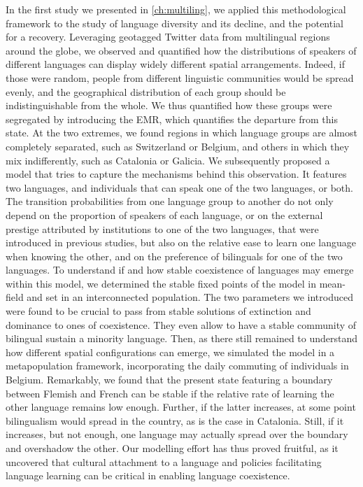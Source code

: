 \documentclass[../thesis.tex]{subfiles}
\begin{document}
In the first study we presented in \cref{ch:multiling}, we applied this methodological
framework to the study of language diversity and its decline, and the potential for a
recovery. Leveraging geotagged Twitter data from multilingual regions around the globe,
we observed and quantified how the distributions of speakers of different languages can
display widely different spatial arrangements. Indeed, if those were random, people from
different linguistic communities would be spread evenly, and the geographical
distribution of each group should be indistinguishable from the whole. We thus
quantified how these groups were segregated by introducing the \ac{EMR}, which
quantifies the departure from this state. At the two extremes, we found regions in which
language groups are almost completely separated, such as Switzerland or Belgium, and
others in which they mix indifferently, such as Catalonia or Galicia. We subsequently
proposed a model that tries to capture the mechanisms behind this observation. It
features two languages, and individuals that can speak one of the two languages, or
both. The transition probabilities from one language group to another do not only depend
on the proportion of speakers of each language, or on the external prestige attributed
by institutions to one of the two languages, that were introduced in previous studies,
but also on the relative ease to learn one language when knowing the other, and on the
preference of bilinguals for one of the two languages. To understand if and how stable
coexistence of languages may emerge within this model, we determined the stable fixed
points of the model in mean-field and set in an interconnected population. The two
parameters we introduced were found to be crucial to pass from stable solutions of
extinction and dominance to ones of coexistence. They even allow to have a stable
community of bilingual sustain a minority language. Then, as there still remained to
understand how different spatial configurations can emerge, we simulated the model in a
metapopulation framework, incorporating the daily commuting of individuals in Belgium.
Remarkably, we found that the present state featuring a boundary between Flemish and
French can be stable if the relative rate of learning the other language remains low
enough. Further, if the latter increases, at some point bilingualism would spread in the
country, as is the case in Catalonia. Still, if it increases, but not enough, one
language may actually spread over the boundary and overshadow the other. Our modelling
effort has thus proved fruitful, as it uncovered that cultural attachment to a language
and policies facilitating language learning can be critical in enabling language
coexistence.
\end{document}
